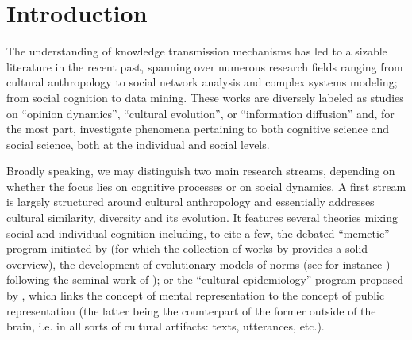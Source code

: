 
\section{Introduction} %

The understanding of knowledge transmission mechanisms has led to a sizable literature in the recent past, spanning over numerous research fields ranging from cultural anthropology to social network analysis and complex systems modeling; from social cognition to data mining. These works are diversely labeled as studies on ``opinion dynamics'', ``cultural evolution'', or ``information diffusion'' and, for the most part, investigate phenomena pertaining to both cognitive science and social science, both at the individual and social levels.

Broadly speaking, we may distinguish two main research streams, depending on whether the focus lies on cognitive processes or on social dynamics. A first stream is largely structured around cultural anthropology and essentially addresses cultural similarity, diversity and its evolution. It features several theories mixing social and individual cognition including, to cite a few, the debated ``memetic'' program initiated by \citet{Dawkins76} (for which the collection of works by \citet{Aunger00} provides a solid overview), the development of evolutionary models of norms (see for instance \citet{Ehrlich05}) following the seminal work of \citet{Boyd85}); or the ``cultural epidemiology'' program proposed by \citet{sper:expl}, which links the concept of mental representation to the concept of public representation (the latter being the counterpart of the former outside of the brain, \hbox{i.e.} in all sorts of cultural artifacts: texts, utterances, etc.).

